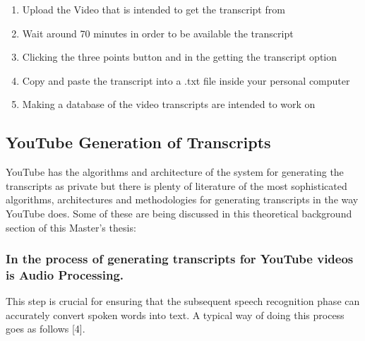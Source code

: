 \begin{enumerate}
    \item Upload the Video that is intended to get the transcript from
    \item Wait around 70 minutes in order to be available the transcript
    \item Clicking the three points button and in the getting the transcript option
    \item Copy and paste the transcript into a .txt file inside your personal computer
    \item Making a database of the video transcripts are intended to work on
\end{enumerate}

\subsection*{YouTube Generation of Transcripts}

YouTube has the algorithms and architecture of the system for generating the transcripts as private but there is plenty of literature of the most sophisticated algorithms, architectures and methodologies for generating transcripts in the way YouTube does. Some of these are being discussed in this theoretical background section of this Master's thesis:

\subsubsection*{In the process of generating transcripts for YouTube videos is Audio Processing.}

This step is crucial for ensuring that the subsequent speech recognition phase can accurately convert spoken words into text. A typical way of doing this process goes as follows [4].

